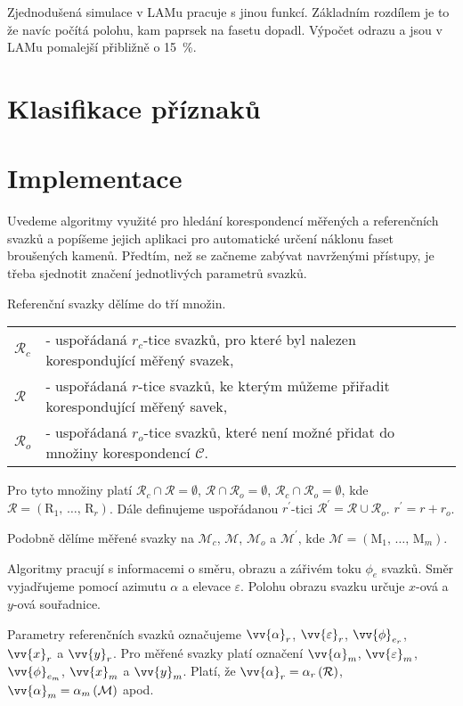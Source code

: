 Zjednodušená simulace v LAMu pracuje s jinou funkcí. Základním rozdílem je to že navíc počítá polohu, kam paprsek na fasetu dopadl. Výpočet odrazu a jsou v LAMu pomalejší přibližně o \SI{15}{\percent}.

\section{Klasifikace příznaků}



\section{Implementace}
	Uvedeme algoritmy využité pro hledání korespondencí měřených a referenčních svazků a popíšeme jejich aplikaci pro automatické určení náklonu faset broušených kamenů. 
	Předtím, než se začneme zabývat navrženými přístupy, je třeba sjednotit značení jednotlivých parametrů svazků. 
	
	Referenční svazky dělíme do tří množin. 
	
	\begin{tabular}{l l}
	$\mathcal{R}_c$ & - uspořádaná $r_c$-tice svazků, pro které byl nalezen korespondující měřený svazek,\\
	$\mathcal{R}$   & - uspořádaná $r$-tice svazků, ke kterým můžeme přiřadit korespondující měřený savek, \\
	$\mathcal{R}_o$ & - uspořádaná $r_o$-tice svazků, které není možné přidat do množiny korespondencí $\mathcal{C}$.  \\
	\end{tabular}	

Pro tyto množiny platí $\mathcal{R}_c \cap \mathcal{R} = \emptyset$, $\mathcal{R} \cap \mathcal{R}_o = \emptyset$, $\mathcal{R}_c \cap \mathcal{R}_o = \emptyset$, kde $\mathcal{R} = \left(\mathrm{R}_1 ,\,\dots,\, \mathrm{R}_r\right)$. Dále definujeme uspořádanou $r^\prime$-tici $\mathcal{R}^\prime = \mathcal{R} \cup \mathcal{R}_o$. $r^\prime = r +r_o $.
	
	Podobně dělíme měřené svazky na $\mathcal{M}_c$, $\mathcal{M}$, $\mathcal{M}_o$ a $ \mathcal{M}^\prime$, kde $\mathcal{M} = \left(\mathrm{M}_1 ,\,\dots,\, \mathrm{M}_m\right)$.
	 
	 Algoritmy pracují s informacemi o směru, obrazu a zářivém toku $\phi_e$ svazků. Směr vyjadřujeme pomocí azimutu $\alpha$ a elevace $\varepsilon$. Polohu obrazu svazku určuje $x$-ová a $y$-ová souřadnice.
	
	 Parametry referenčních svazků označujeme $\vv{\alpha}_{r}$, $\vv{\varepsilon}_{r}$, $\vv{\phi}_{e_{r}}$, $\vv{x}_r$  a $\vv{y}_r$. Pro měřené svazky platí označení $\vv{\alpha}_{m}$, $\vv{\varepsilon}_{m}$, $\vv{\phi}_{e_{m}}$, $\vv{x}_m$  a $\vv{y}_m$. Platí, že $\vv{\alpha}_{r} = \alpha_{r}\left(\mathcal{R}\right)$, $\vv{\alpha}_{m} = \alpha_{m}\left(\mathcal{M}\right)$ apod. 

